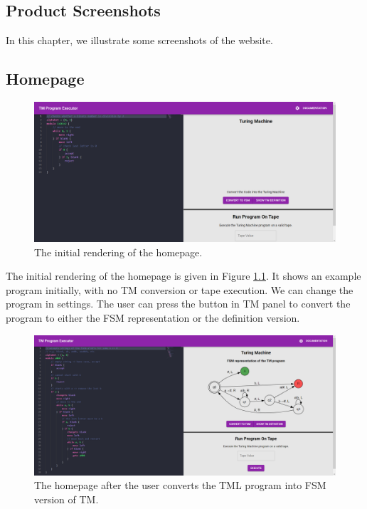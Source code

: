 \begin{appendices}
\chapter{Product Screenshots}
In this chapter, we illustrate some screenshots of the website.

\section{Homepage}
\begin{figure}[htb]
    \centering
    \includegraphics[scale=0.18]{images/Homepage at start.png}
    \caption{The initial rendering of the homepage.}
    \label{fig:homepage_initial}
\end{figure}
The initial rendering of the homepage is given in Figure \ref{fig:homepage_initial}. It shows an example program initially, with no TM conversion or tape execution. We can change the program in settings. The user can press the button in TM panel to convert the program to either the FSM representation or the definition version.

\begin{figure}[htb]
    \centering
    \includegraphics[scale=0.18]{images/Homepage w. TM.png}
    \caption{The homepage after the user converts the TML program into FSM version of TM.}
    \label{fig:homepage_tm_conversion_fsm}
\end{figure}


\end{appendices}
